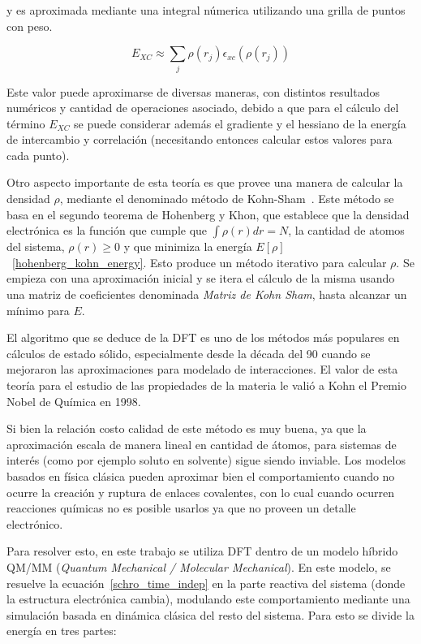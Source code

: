 y es aproximada mediante una integral n\'umerica utilizando una grilla de puntos con peso.

\begin{equation}
    \label{approx_excenergy}
    E_{XC} \approx \sum_j \rho(r_j) \epsilon_{xc} (\rho(r_j))
\end{equation}

Este valor puede aproximarse de diversas maneras, con distintos resultados num\'ericos y cantidad de operaciones
asociado, debido a que para el c\'alculo del t\'ermino $E_{XC}$ se puede considerar adem\'as el gradiente
y el hessiano de la energ\'ia de intercambio y correlaci\'on (necesitando entonces calcular
estos valores para cada punto).

Otro aspecto importante de esta teor\'ia es que provee una manera de calcular la densidad $\rho$,
mediante el denominado m\'etodo de Kohn-Sham~\cite{KohnSham}. Este m\'etodo se basa en el segundo teorema
de Hohenberg y Khon, que establece que la densidad electr\'onica es la funci\'on que
cumple que $\int \rho(r) dr = N$, la cantidad de atomos del sistema, $\rho(r) \geq 0$ y que
minimiza la energ\'ia $E[\rho]$~\ref{hohenberg_kohn_energy}. Esto produce
un m\'etodo iterativo para calcular $\rho$. Se empieza con una aproximaci\'on inicial y
se itera el c\'alculo de la misma usando una matriz de coeficientes denominada \textit{Matriz de Kohn Sham}, hasta
alcanzar un m\'inimo para $E$.

El algoritmo que se deduce de la DFT es uno de los m\'etodos m\'as populares en c\'alculos
de estado s\'olido, especialmente desde la d\'ecada del 90 cuando se mejoraron las aproximaciones para modelado de
interacciones. El valor de esta teor\'ia para el estudio de las propiedades de la materia le vali\'o a Kohn el Premio Nobel
de Qu\'imica en 1998.

Si bien la relaci\'on costo calidad de este m\'etodo es muy buena, ya que la aproximaci\'on escala de manera lineal
en cantidad de \'atomos, para sistemas de inter\'es (como por ejemplo soluto en solvente) sigue siendo inviable. Los
modelos basados en f\'isica cl\'asica pueden aproximar bien el comportamiento cuando no ocurre la creaci\'on y ruptura
de enlaces covalentes, con lo cual cuando ocurren reacciones qu\'imicas no es posible usarlos ya que no proveen un
detalle electr\'onico.

Para resolver esto, en este trabajo se utiliza DFT dentro de un modelo h\'ibrido QM/MM (\textit{Quantum Mechanical / Molecular Mechanical}).
En este modelo, se resuelve la ecuaci\'on~\ref{schro_time_indep} en la parte reactiva del sistema (donde la estructura
electr\'onica cambia), modulando este comportamiento mediante una simulaci\'on basada en din\'amica
cl\'asica del resto del sistema. Para esto se divide la energ\'ia en tres partes:

